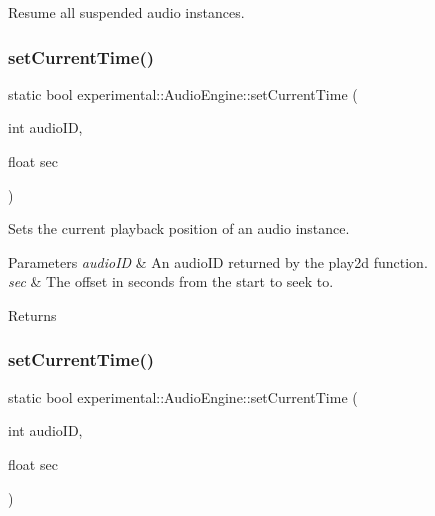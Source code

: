 Resume all suspended audio instances. \mbox{\label{classexperimental_1_1AudioEngine_aa61e7a0b9ad959c203944ad701486dab}} 
\subsubsection{\texorpdfstring{set\+Current\+Time()}{setCurrentTime()}\hspace{0.1cm}{\footnotesize\ttfamily [1/2]}}
{\footnotesize\ttfamily static bool experimental\+::\+Audio\+Engine\+::set\+Current\+Time (\begin{DoxyParamCaption}\item[{int}]{audio\+ID,  }\item[{float}]{sec }\end{DoxyParamCaption})\hspace{0.3cm}{\ttfamily [static]}}

Sets the current playback position of an audio instance.


\begin{DoxyParams}{Parameters}
{\em audio\+ID} & An audio\+ID returned by the play2d function. \\
\hline
{\em sec} & The offset in seconds from the start to seek to. \\
\hline
\end{DoxyParams}
\begin{DoxyReturn}{Returns}

\end{DoxyReturn}
\mbox{\label{classexperimental_1_1AudioEngine_aa61e7a0b9ad959c203944ad701486dab}} 
\subsubsection{\texorpdfstring{set\+Current\+Time()}{setCurrentTime()}\hspace{0.1cm}{\footnotesize\ttfamily [2/2]}}
{\footnotesize\ttfamily static bool experimental\+::\+Audio\+Engine\+::set\+Current\+Time (\begin{DoxyParamCaption}\item[{int}]{audio\+ID,  }\item[{float}]{sec }\end{DoxyParamCaption})\hspace{0.3cm}{\ttfamily [static]}}

